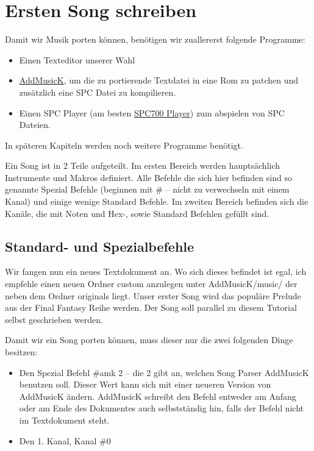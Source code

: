 \section{Ersten Song schreiben}
\label{sec:ErstenSongSchreiben}

Damit wir Musik porten können, benötigen wir zuallererst folgende Programme:
\begin{itemize}
	\item Einen Texteditor unserer Wahl
	\item \href{https://dl.smwcentral.net/24994/AddmusicK_1.0.8.zip}{AddMusicK}, um die zu portierende Textdatei in eine Rom zu patchen und zusätzlich eine SPC Datei zu kompilieren.
	\item Einen SPC Player (am besten \href{https://dl.smwcentral.net/15205/SPC700\%20PLAYER.zip}{SPC700 Player}) zum abspielen von SPC Dateien.
\end{itemize}

In späteren Kapiteln werden noch weitere Programme benötigt.

\bigskip

Ein Song ist in 2 Teile aufgeteilt. Im ersten Bereich werden hauptsächlich Instrumente und Makros definiert. Alle Befehle die sich hier befinden sind so genannte Spezial Befehle (beginnen mit \# -- nicht zu verwechseln mit einem Kanal) und einige wenige Standard Befehle. Im zweiten Bereich befinden sich die Kanäle, die mit Noten und Hex-, sowie Standard Befehlen gefüllt sind.

\subsection{Standard- und Spezialbefehle}

Wir fangen nun ein neues Textdokument an. Wo sich dieses befindet ist egal, ich empfehle einen neuen Ordner custom anzulegen unter AddMusicK/music/ der neben dem Ordner originals liegt. Unser erster Song wird das populäre Prelude aus der Final Fantasy Reihe werden. Der Song soll parallel zu diesem Tutorial selbst geschrieben werden.

\bigskip

Damit wir ein Song porten können, muss dieser nur die zwei folgenden Dinge besitzen:
\begin{itemize}
	\item Den Spezial Befehl \#amk 2 -- die 2 gibt an, welchen Song Parser AddMusicK benutzen soll. Dieser Wert kann sich mit einer neueren Version von AddMusicK ändern. AddMusicK schreibt den Befehl entweder am Anfang oder am Ende des Dokumentes auch selbstständig hin, falls der Befehl nicht im Textdokument steht.
	\item Den 1. Kanal, Kanal \#0
\end{itemize}

